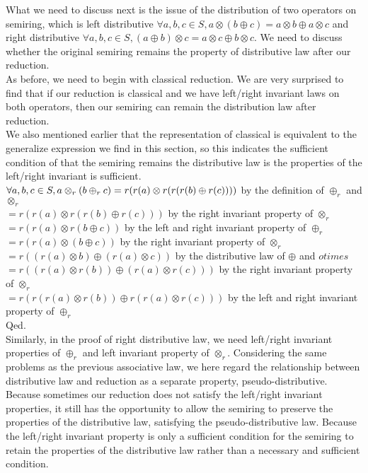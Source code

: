 \documentclass[a4paper,10pt]{article}
\begin{document}
What we need to discuss next is the issue of the distribution of two operators on semiring, which is left distributive $\forall a,b,c \in S, a\otimes (b \oplus c) = a \otimes b \oplus a \otimes c$ and right distributive $\forall a,b,c \in S, (a \oplus b) \otimes c = a \otimes c \oplus b \otimes c$.
We need to discuss whether the original semiring remains the property of distributive law after our reduction. \\
As before, we need to begin with classical reduction. We are very surprised to find that if our reduction is classical and we have left/right invariant laws on both operators, then our semiring can remain the distribution law after reduction.\\
We also mentioned earlier that the representation of classical is equivalent to the generalize expression we find in this section, so this indicates the sufficient condition of that the semiring remains the distributive law is the properties of the left/right invariant is sufficient.\\
$\forall a,b,c \in S,  a \otimes_r (b \oplus_r c)  \\
= r(r(a) \otimes r(r(r(b)\oplus r(c)))) $ by the definition of $\oplus_r$ and $\otimes_r$\\
$= r(r(a) \otimes r(r(b)\oplus r(c))) $ by the right invariant property of $\otimes_r$\\
$= r(r(a) \otimes r(b \oplus c)) $ by the left and right invariant property of $\oplus_r$\\
$= r(r(a) \otimes (b \oplus c)) $ by the right invariant property of $\otimes_r$\\
$= r((r(a) \otimes b) \oplus (r(a) \otimes c)) $ by the distributive law of $\oplus$ and $otimes$\\
$= r((r(a) \otimes r(b)) \oplus (r(a) \otimes r(c))) $ by the right invariant property of $\otimes_r$\\
$= r(r(r(a) \otimes r(b)) \oplus r(r(a) \otimes r(c))) $ by the left and right invariant property of $\oplus_r$\\
Qed.\\
Similarly, in the proof of right distributive law, we need left/right invariant properties of $\oplus_r$ and left invariant property of $\otimes_r$.
Considering the same problems as the previous associative law, we here regard the relationship between distributive law and reduction as a separate property, pseudo-distributive.
Because sometimes our reduction does not satisfy the left/right invariant properties, it still has the opportunity to allow the semiring to preserve the properties of the distributive law, satisfying the pseudo-distributive law. Because the left/right invariant property is only a sufficient condition for the semiring to retain the properties of the distributive law rather than a necessary and sufficient condition. \\
\end{document}
